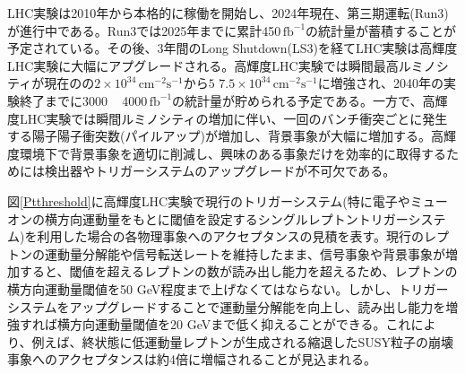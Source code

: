 LHC実験は2010年から本格的に稼働を開始し、2024年現在、第三期運転(Run3)が進行中である。Run3では2025年までに累計450\,$\mathrm{fb}^{-1}$の統計量が蓄積することが予定されている。その後、3年間のLong Shutdown(LS3)を経てLHC実験は高輝度LHC実験に大幅にアプグレードされる。高輝度LHC実験では瞬間最高ルミノシティが現在のの$2\times10^{34}\,\mathrm{cm}^{-2}\mathrm{s}^{-1}$から$5 \text{~} 7.5\times10^{34}\,\mathrm{cm}^{-2}\mathrm{s}^{-1}$に増強され、2040年の実験終了までに3000 ~ 4000\,$\mathrm{fb}^{-1}$の統計量が貯められる予定である。一方で、高輝度LHC実験では瞬間ルミノシティの増加に伴い、一回のバンチ衝突ごとに発生する陽子陽子衝突数(パイルアップ)が増加し、背景事象が大幅に増加する。高輝度環境下で背景事象を適切に削減し、興味のある事象だけを効率的に取得するためには検出器やトリガーシステムのアップグレードが不可欠である。\par

図\ref{Ptthreshold}に高輝度LHC実験で現行のトリガーシステム(特に電子やミューオンの横方向運動量をもとに閾値を設定するシングルレプトントリガーシステム)を利用した場合の各物理事象へのアクセプタンスの見積を表す。現行のレプトンの運動量分解能や信号転送レートを維持したまま、信号事象や背景事象が増加すると、閾値を超えるレプトンの数が読み出し能力を超えるため、レプトンの横方向運動量閾値を50 GeV程度まで上げなくてはならない。しかし、トリガーシステムをアップグレードすることで運動量分解能を向上し、読み出し能力を増強すれば横方向運動量閾値を20 GeVまで低く抑えることができる。これにより、例えば、終状態に低運動量レプトンが生成される縮退したSUSY粒子の崩壊事象へのアクセプタンスは約4倍に増幅されることが見込まれる。



